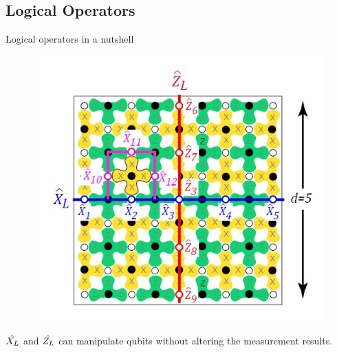 \documentclass{beamer}
\begin{document}
    \subsection{Logical Operators}
    \begin{frame}{Logical operators in a nutshell}
        \begin{figure}
            \centering
            \includegraphics[height=0.6\textheight]{./Images/surf-code-logical.jpg}
        \end{figure}
        $ \sshat{X_L} $ and $ \sshat{Z_L} $ can manipulate qubits without altering the measurement results.
    \end{frame}
\end{document}
